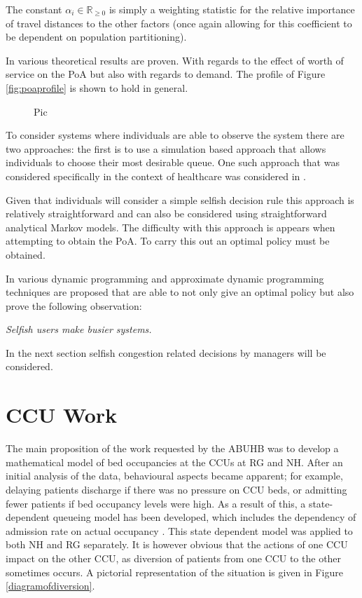 \documentclass[a4paper,11pt]{article}
\begin{document}
The constant $\alpha_i\in\mathbb{R}_{\geq0}$ is simply a weighting statistic for the relative importance of travel distances to the other factors (once again allowing for this coefficient to be dependent on population partitioning).

In \cite{} various theoretical results are proven. With regards to the effect of worth of service on the PoA but also with regards to demand. The profile of Figure \ref{fig:poaprofile} is shown to hold in general.

\begin{figure}[!hbtp]
Pic
\end{figure}

To consider systems where individuals are able to observe the system there are two approaches: the first is to use a simulation based approach that allows individuals to choose their most desirable queue.
One such approach that was considered specifically in the context of healthcare was considered in \cite{}.

Given that individuals will consider a simple selfish decision rule this approach is relatively straightforward and can also be considered using straightforward analytical Markov models.
The difficulty with this approach is appears when attempting to obtain the PoA.
To carry this out an optimal policy must be obtained.

In \cite{} various dynamic programming and approximate dynamic programming techniques are proposed that are able to not only give an optimal policy but also prove the following observation:

\begin{center}
\textit{Selfish users make busier systems.}
\end{center}

In the next section selfish congestion related decisions by managers will be considered.

\section{CCU Work}

The main proposition of the work requested by the ABUHB was to develop a mathematical model of bed occupancies at the CCUs at RG and NH.
After an initial analysis of the data, behavioural aspects became apparent; for example, delaying patients discharge if there was no pressure on CCU beds, or admitting fewer patients if bed occupancy levels were high.
As a result of this, a state-dependent queueing model has been developed, which includes the dependency of admission rate on actual occupancy \cite{Komenda2013}.
This state dependent model was applied to both NH and RG separately.
It is however obvious that the actions of one CCU impact on the other CCU, as diversion of patients from one CCU to the other sometimes occurs.
A pictorial representation of the situation is given in Figure \ref{diagramofdiversion}.
\end{document}
